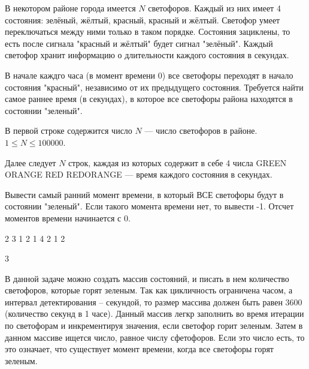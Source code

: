 
В некотором районе города имеется $N$ светофоров. Каждый из них имеет 4 состояния: зелёный, жёлтый, красный, красный и жёлтый. Светофор умеет переключаться между ними только в таком порядке. Состояния зациклены, то есть после сигнала "красный и жёлтый" будет сигнал "зелёный". Каждый светофор хранит информацию о длительности каждого состояния в секундах.

В начале каждго часа (в момент времени 0) все светофоры переходят в начало состояния "красный", независимо от их предыдущего состояния. Требуется найти самое раннее время (в секундах), в которое все светофоры района находятся в состоянии "зеленый".


В первой строке содержится число $N$ — число светофоров в районе. $1 \leq N \leq 100000$.

Далее следует $N$ строк, каждая из которых содержит в себе 4 числа GREEN ORANGE RED REDORANGE — время каждого состояния в секундах.

\outputfmtSection

Вывести самый ранний момент времени, в который ВСЕ светофоры будут в состоянии "зеленый". Если такого момента времени нет, то вывести -1. Отсчет моментов времени начинается с 0.


\begin{myverbbox}[\small]{\vinput}
    2 
    3 1 2 1 
    4 2 1 2 
\end{myverbbox}
\begin{myverbbox}[\small]{\voutput}
    3
\end{myverbbox}

\solutionSection

В данной задаче можно создать массив состояний, и писать в нем количество светофоров, которые горят зеленым. Так как цикличность ограничена часом, а интервал детектирования – секундой, то размер массива должен быть равен 3600 (количество секунд в 1 часе). Данный массив легкр заполнить во время итерации по светофорам и инкрементируя значения, если светофор горит зеленым. Затем в данном массиве ищется число, равное числу сфетофоров. Если это число есть, то это означает, что существует момент времени, когда все светофоры горят зеленым.

